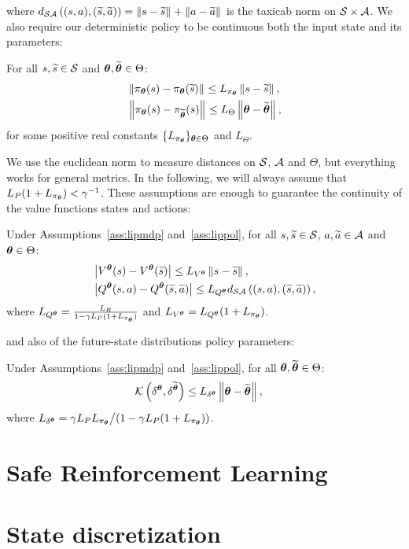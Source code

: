 %
where $d_{\mathcal{S}\mathcal{A}}\left((s,a),(\widetilde{s},\widetilde{a})\right) = \left\|s-\widetilde{s}\right\|_{} + \left\|a-\widetilde{a}\right\|_{}$ is the taxicab norm on $\mathcal{S}\times\mathcal{A}$.
We also require our deterministic policy to be continuous both \wrt the input state and its parameters:
%
\begin{assumption}\label{ass:lippol}
	For all $s,\widetilde{s}\in\mathcal{S}$ and $\boldsymbol{\theta},\widetilde{\boldsymbol{\theta}}\in\Theta$:
	\begin{align}
	&\left\|\pi_{\boldsymbol{\theta}}(s) - \pi_{\boldsymbol{\theta}}(\widetilde{s})\right\|_{} \leq L_{\pi_{\boldsymbol{\theta}}}\left\|s-\widetilde{s}\right\|_{}, \\
	&\left\|\pi_{\boldsymbol{\theta}}(s) - \pi_{\widetilde{\boldsymbol{\theta}}}(s)\right\|_{} \leq L_{\Theta}\left\|\boldsymbol{\theta}-\widetilde{\boldsymbol{\theta}}\right\|_{},
	\end{align}
	for some positive real constants $\{L_{\pi_{\boldsymbol{\theta}}}\}_{\boldsymbol{\theta}\in\Theta}$ and $L_{\Theta}$.
\end{assumption}
%
We use the euclidean norm to measure distances on $\mathcal{S}$, $\mathcal{A}$ and $\Theta$, but everything works for general metrics.
In the following, we will always assume that ${L_{P}(1+L_{\pi_{\boldsymbol{\theta}}}) < \gamma^{-1}}$.
These assumptions are enough to guarantee the continuity of the value functions \wrt states and actions:
%
\begin{lemma}\label{lem:lipval}
	Under Assumptions~\ref{ass:lipmdp} and~\ref{ass:lippol}, for all $s,\widetilde{s}\in\mathcal{S}$, $a,\widetilde{a}\in\mathcal{A}$ and $\boldsymbol{\theta}\in\Theta$:
	\begin{align}
	&\left|V^{\boldsymbol{\theta}}(s) - V^{\boldsymbol{\theta}}(\widetilde{s})\right| \leq L_{V^{\boldsymbol{\theta}}}\left\|s-\widetilde{s}\right\|_{}, \\
	&\left|Q^{\boldsymbol{\theta}}(s,a) - Q^{\boldsymbol{\theta}}(\widetilde{s},\widetilde{a})\right| \leq L_{Q^{\boldsymbol{\theta}}}d_{\mathcal{S}\mathcal{A}}\left((s,a),(\widetilde{s},\widetilde{a})\right),
	\end{align}
	where $L_{Q^{\boldsymbol{\theta}}} = \frac{L_{R}}{1-\gamma L_{P}(1+L_{\pi_{\boldsymbol{\theta}}})}$ and $L_{V^{\boldsymbol{\theta}}} = L_{Q^{\boldsymbol{\theta}}}(1+L_{\pi_{\boldsymbol{\theta}}})$.
\end{lemma}
%
and also of the future-state distributions \wrt policy parameters:
%
\begin{lemma}\label{lem:lipfut}
	Under Assumptions~\ref{ass:lipmdp} and~\ref{ass:lippol}, for all $\boldsymbol{\theta},\widetilde{\boldsymbol{\theta}}\in\Theta$:
	\begin{align}
	&\mathcal{K}\left(\delta^{\boldsymbol{\theta}},\delta^{\widetilde{\boldsymbol{\theta}}}\right) \leq L_{\delta^{\boldsymbol{\theta}}}\left\|\boldsymbol{\theta}-\widetilde{\boldsymbol{\theta}}\right\|_{},
	\end{align}
	where $L_{\delta^{\boldsymbol{\theta}}} = {\gamma L_{P}L_{\pi_{\boldsymbol{\theta}}}}\big/{\left(1-\gamma L_{P}(1+L_{\pi_{\boldsymbol{\theta}}})\right)}$.
\end{lemma}

\section{Safe Reinforcement Learning}\label{sec:saferl}

\section{State discretization} \label{sec:stdisc}
